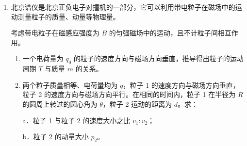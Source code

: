 \documentclass[\gkver]{gaokaozhenti}
\begin{document}
\begin{enumerate}
{可得 $v_{0} = gt$

（2）爆炸瞬间水平方向动量守恒，爆炸前总动量为 0。A 速度为 $v$，设 B 速度为 $v_{B}$，由动量守恒定律得 $0 = 2mv + mv_{B}$

解得 $v_{B} = -2v$

即大小为 $2v$

（3）根据竖直上抛运动的对称性可知下落时间与上升时间相等为 $t$，则 A 的水平位移 $x_{A} = vt$，B 的水平位移 $x_{B} = v_{B}t = 2vt$。所以落地点 A、B 之间的距离 $d = |x_{A}| + |x_{B}| = vt + 2vt = 3vt$
}

\item
北京谱仪是北京正负电子对撞机的一部分，它可以利用带电粒子在磁场中的运动测量粒子的质量、动量等物理量。

考虑带电粒子在磁感应强度为 $B$ 的匀强磁场中的运动，且不计粒子间相互作用。
\begin{enumerate}
	\item
	一个电荷量为 $q_{0}$ 的粒子的速度方向与磁场方向垂直，推导得出粒子的运动周期 $T$ 与质量 $m$ 的关系。
	\item
	两个粒子质量相等、电荷量均为 $q$，粒子 1 的速度方向与磁场方向垂直，粒子 2 的速度方向与磁场方向平行。在相同的时间内，粒子 1 在半径为 $R$ 的圆周上转过的圆心角为 $\theta$，粒子 2 运动的距离为 $d$。求：

	a．粒子 1 与粒子 2 的速度大小之比 $v_{1}:v_{2}$；

	b．粒子 2 的动量大小 $p_{2}$。
\end{enumerate}

\end{enumerate}
\end{document}
